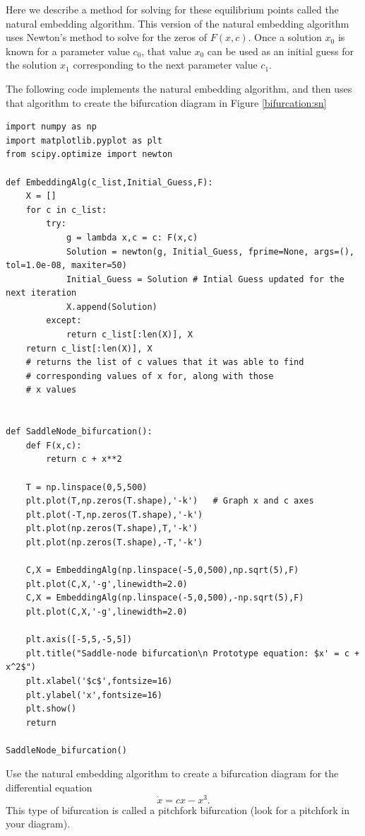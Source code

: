 Here we describe a method for solving for these equilibrium points called the natural embedding algorithm. This version of the natural embedding algorithm uses Newton's method to solve for the zeros of $F(x,c).$ Once a solution $x_0$ is known for a parameter value $c_0$, that value $x_0$ can be used as an initial guess for the solution $x_1$ corresponding to the next parameter value $c_1$.

The following code implements the natural embedding algorithm, and then uses that algorithm to create the bifurcation diagram in Figure \ref{bifurcation:sn}

\begin{lstlisting}
import numpy as np
import matplotlib.pyplot as plt
from scipy.optimize import newton

def EmbeddingAlg(c_list,Initial_Guess,F):
	X = []
	for c in c_list:
		try:
			g = lambda x,c = c: F(x,c)
			Solution = newton(g, Initial_Guess, fprime=None, args=(), tol=1.0e-08, maxiter=50)
			Initial_Guess = Solution # Intial Guess updated for the next iteration
			X.append(Solution)
		except:
			return c_list[:len(X)], X	
	return c_list[:len(X)], X   		
	# returns the list of c values that it was able to find  
	# corresponding values of x for, along with those 					
	# x values
	
	
def SaddleNode_bifurcation():
	def F(x,c):
		return c + x**2
	
	T = np.linspace(0,5,500)
	plt.plot(T,np.zeros(T.shape),'-k')   # Graph x and c axes
	plt.plot(-T,np.zeros(T.shape),'-k')
	plt.plot(np.zeros(T.shape),T,'-k')
	plt.plot(np.zeros(T.shape),-T,'-k')
	
	C,X = EmbeddingAlg(np.linspace(-5,0,500),np.sqrt(5),F)
	plt.plot(C,X,'-g',linewidth=2.0)
	C,X = EmbeddingAlg(np.linspace(-5,0,500),-np.sqrt(5),F)
	plt.plot(C,X,'-g',linewidth=2.0)
	
	plt.axis([-5,5,-5,5])
	plt.title("Saddle-node bifurcation\n Prototype equation: $x' = c + x^2$")
	plt.xlabel('$c$',fontsize=16)
	plt.ylabel('x',fontsize=16)
	plt.show()
	return

SaddleNode_bifurcation()

\end{lstlisting}
% 

% 
\begin{problem}
Use the natural embedding algorithm to create a bifurcation diagram for the differential equation
\[\dot{x} = cx-x^3.\]
This type of bifurcation is called a pitchfork bifurcation (look for a pitchfork in your diagram).
\end{problem}

